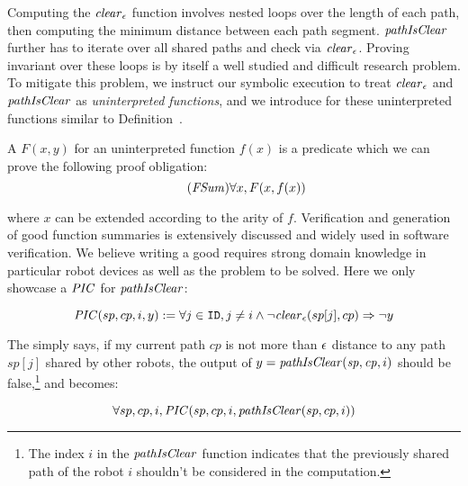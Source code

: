 Computing the $\mathit{clear}_\epsilon$ function involves nested loops over the length of each path,
then computing the minimum distance between each path segment.
$\mathit{pathIsClear}$ further has to iterate over all shared paths and check via $\mathit{clear}_\epsilon$.
Proving invariant over these loops is by itself a well studied and difficult research problem.
To mitigate this problem,
we instruct our symbolic execution to treat $\mathit{clear}_\epsilon$ and $\mathit{pathIsClear}$ as \emph{uninterpreted functions},
and we introduce \emph{\funcasum} for these uninterpreted functions similar to Definition~.
\begin{definition}
    A \emph{\funcasum} $F(x, y)$ for an uninterpreted function $f(x)$ is a predicate which
    we can prove the following proof obligation:
    \begin{equation}\label{po:func-sum}\tag{\textit{FSum}}
    \forall x, F(x, f(x))
    \end{equation}
\end{definition}
\noindent
where $x$ can be extended according to the arity of $f$.
Verification and generation of good function summaries is extensively discussed and widely used
in software verification.
We believe writing a good \funcasum{} requires strong domain knowledge in particular robot devices as well as the problem to be solved.
Here we only showcase a \funcasum $\mathit{PIC}$ for $\mathit{pathIsClear}$:
\begin{small}
\[
\mathit{PIC}(sp, cp, i, y) := \forall j \in \texttt{ID}, j\neq i \land \neg\mathit{clear}_\epsilon(sp[j], cp) \Rightarrow \neg y
\]
\end{small}
The \funcasum simply says, if my current path $cp$ is not more than $\epsilon$ distance to any path $sp[j]$ shared by other robots,
the output of $y = \mathit{pathIsClear}(\mathit{sp}, \mathit{cp}, i)$ should be false,\footnote{%
The index $i$ in the $\mathit{pathIsClear}$ function indicates that the previously shared path of the robot $i$ shouldn't be considered in the computation.}
and  becomes:
\begin{proofob}
    \label{po:pathclear}
    $$\forall sp, cp, i, \mathit{PIC}(sp, cp, i, \mathit{pathIsClear}(sp,cp, i))$$
\end{proofob}

